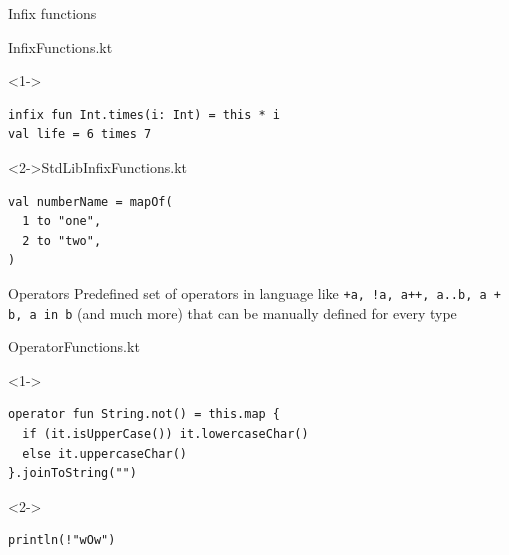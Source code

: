 \documentclass[hyperref={pdfpagelabels=false},xcolor={dvipsnames},compress]{beamer}
\begin{document}
    \begin{frame}[fragile]{Infix functions}
        \begin{exampleblock}{InfixFunctions.kt}
            \begin{onlyenv}<1->
                \begin{lstlisting}
infix fun Int.times(i: Int) = this * i
val life = 6 times 7
                \end{lstlisting}
            \end{onlyenv}
        \end{exampleblock}
        \begin{exampleblock}
            <2->{StdLibInfixFunctions.kt}
            \begin{onlyenv}
                \begin{lstlisting}
val numberName = mapOf(
  1 to "one",
  2 to "two",
)
                \end{lstlisting}
            \end{onlyenv}
        \end{exampleblock}
    \end{frame}

    \begin{frame}[fragile]{Operators}
        Predefined set of operators in language like \texttt{+a, !a, a++, a..b, a + b, a in b} (and much more) that can be manually defined for every type
        \begin{exampleblock}{OperatorFunctions.kt}
            \begin{onlyenv}<1->
                \begin{lstlisting}
operator fun String.not() = this.map { 
  if (it.isUpperCase()) it.lowercaseChar()
  else it.uppercaseChar()
}.joinToString("")
                \end{lstlisting}
            \end{onlyenv}
            \begin{onlyenv}<2->
                \begin{lstlisting}
println(!"wOw")
                \end{lstlisting}
            \end{onlyenv}
        \end{exampleblock}
    \end{frame}
\end{document}

